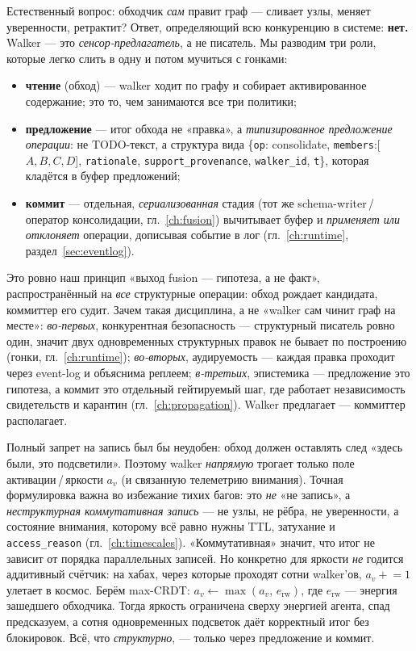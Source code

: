 Естественный вопрос: обходчик \emph{сам} правит граф — сливает узлы, меняет
уверенности, ретрактит? Ответ, определяющий всю конкуренцию в системе: \textbf{нет.}
Walker — это \emph{сенсор-предлагатель}, а не писатель. Мы разводим три роли, которые
легко слить в одну и потом мучиться с гонками:
\begin{itemize}\itemsep2pt
\item \textbf{чтение} (обход) — walker ходит по графу и собирает активированное
содержание; это то, чем занимаются все три политики;
\item \textbf{предложение} — итог обхода не «правка», а \emph{типизированное
предложение операции}: не TODO-текст, а структура вида
\{\texttt{op}: consolidate, \texttt{members}:[$A,B,C,D$], \texttt{rationale},
\texttt{support\_provenance}, \texttt{walker\_id}, \texttt{t}\}, которая кладётся в
буфер предложений;
\item \textbf{коммит} — отдельная, \emph{сериализованная} стадия (тот же
schema-writer\,/\,оператор консолидации, гл.~\ref{ch:fusion}) вычитывает буфер и
\emph{применяет или отклоняет} операции, дописывая событие в лог
(гл.~\ref{ch:runtime}, раздел~\ref{sec:eventlog}).
\end{itemize}

Это ровно наш принцип «выход fusion — гипотеза, а не факт», распространённый на \emph{все}
структурные операции: обход рождает кандидата, коммиттер его судит. Зачем такая
дисциплина, а не «walker сам чинит граф на месте»: \emph{во-первых}, конкурентная
безопасность — структурный писатель ровно один, значит двух одновременных структурных
правок не бывает по построению (гонки, гл.~\ref{ch:runtime}); \emph{во-вторых},
аудируемость — каждая правка проходит через event-log и объяснима реплеем;
\emph{в-третьих}, эпистемика — предложение это гипотеза, а коммит это отдельный
гейтируемый шаг, где работает независимость свидетельств и карантин
(гл.~\ref{ch:propagation}). Walker предлагает — коммиттер располагает.

\begin{pitfall}
Полный запрет на запись был бы неудобен: обход должен оставлять след «здесь были, это
подсветили». Поэтому walker \emph{напрямую} трогает только поле активации\,/\,яркости
$a_v$ (и связанную телеметрию внимания). Точная формулировка важна во избежание тихих
багов: это \emph{не} «не запись», а \emph{неструктурная коммутативная запись} — не
узлы, не рёбра, не уверенности, а состояние внимания, которому всё равно нужны TTL,
затухание и \texttt{access\_reason} (гл.~\ref{ch:timescales}). «Коммутативная» значит,
что итог не зависит от порядка параллельных записей. Но конкретно для яркости \emph{не}
годится аддитивный счётчик: на хабах, через которые проходят сотни walker'ов,
$a_v\mathrel{+}=1$ улетает в космос. Берём max-CRDT: $a_v \leftarrow \max(a_v,\,e_{\text{rw}})$,
где $e_{\text{rw}}$ — энергия зашедшего обходчика. Тогда яркость ограничена сверху
энергией агента, спад предсказуем, а сотня одновременных подсветок даёт корректный
итог без блокировок. Всё, что \emph{структурно}, — только через предложение и коммит.
\end{pitfall}

